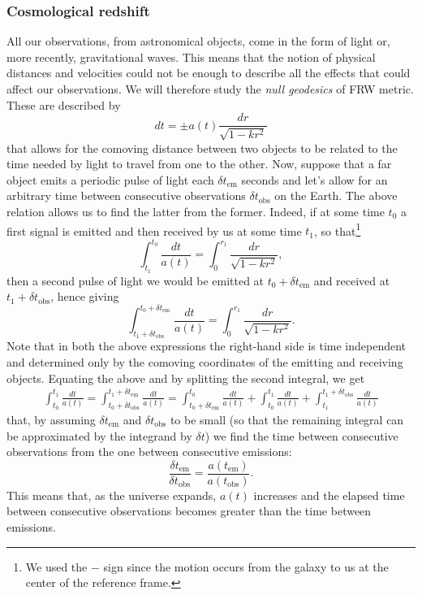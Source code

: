 \subsubsection{Cosmological redshift}
All our observations, from astronomical objects, come in the form of light or, more recently, gravitational waves. This means that the notion of physical distances and velocities could not be enough to describe all the effects that could affect our observations. We will therefore study the \emph{null geodesics} of FRW metric. These are described by $$dt=\pm a(t)\frac{dr}{\sqrt{1-kr^2}}$$ that allows for the comoving distance between two objects to be related to the time needed by light to travel from one to the other. Now, suppose that a far object emits a periodic pulse of light each $\delta t_{\text{em}}$ seconds and let's allow for an arbitrary time between consecutive observations $\delta t_{\text{obs}}$ on the Earth. The above relation allows us to find the latter from the former. Indeed, if at some time $t_0$ a first signal is emitted and then received by us at some time $t_1$, so that\footnote{We used the $-$ sign since the motion occurs from the galaxy to us at the center of the reference frame.}
$$\int_{t_1}^{t_0}\frac{dt}{a(t)}=\int_{0}^{r_1}\frac{dr}{\sqrt{1-kr^2}},$$ then a second pulse of light we would be emitted at $t_0+\delta t_{\text{em}}$ and received at $t_1+\delta t_{\text{obs}}$, hence giving $$\int_{t_1+\delta t_{\text{obs}}}^{t_0+\delta t_{\text{em}}}\frac{dt}{a(t)}=\int_{0}^{r_1}\frac{dr}{\sqrt{1-kr^2}}.$$Note that in both the above expressions the right-hand side is time independent and determined only by the comoving coordinates of the emitting and receiving objects. Equating the above and by splitting the second integral, we get
\begin{align*}
    \int^{t_1}_{t_0}\frac{dt}{a(t)}=\int^{t_1+\delta t_{\text{em}}}_{t_0+\delta t_{\text{obs}}}\frac{dt}{a(t)}=\int_{t_0+\delta t_{\text{em}}}^{t_0}\frac{dt}{a(t)}+\int^{t_1}_{t_0}\frac{dt}{a(t)}+\int^{t_1+\delta t_{\text{obs}}}_{t_1}\frac{dt}{a(t)}
\end{align*}
that, by assuming $\delta t_{\text{em}}$ and $\delta t_{\text{obs}}$ to be small (so that the remaining integral can be approximated by the integrand by $\delta t$) we find the time between consecutive observations from the one between consecutive emissions:
\begin{equation}
    \label{eq:delta_t1/delta_t2}
    \frac{\delta t_{\text{em}}}{\delta t_{\text{obs}}}=\frac{a(t_{\text{em}})}{a(t_{\text{obs}})}.
\end{equation}
This means that, as the universe expands, $a(t)$ increases and the elapsed time between consecutive observations becomes greater than the time between emissions.

